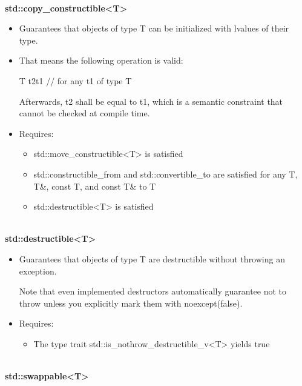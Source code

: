 \noindent
\hspace*{\fill} \\ %
\textbf{std::copy\_constructible<T>}

\begin{itemize}
\item
Guarantees that objects of type T can be initialized with lvalues of their type.

\item
That means the following operation is valid:

\begin{cpp}
T t2{t1} // for any t1 of type T
\end{cpp}

Afterwards, t2 shall be equal to t1, which is a semantic constraint that cannot be checked at compile time.

\item
Requires:
\begin{itemize}
\item
std::move\_constructible<T> is satisfied

\item
std::constructible\_from and std::convertible\_to are satisfied for any T, T\&, const T, and const T\& to T

\item
std::destructible<T> is satisfied
\end{itemize}
\end{itemize}


\noindent
\hspace*{\fill} \\ %
\textbf{std::destructible<T>}

\begin{itemize}
\item
Guarantees that objects of type T are destructible without throwing an exception.

Note that even implemented destructors automatically guarantee not to throw unless you explicitly mark them with noexcept(false).

\item
Requires:
\begin{itemize}
\item
The type trait std::is\_nothrow\_destructible\_v<T> yields true
\end{itemize}
\end{itemize}

\noindent
\hspace*{\fill} \\ %
\textbf{std::swappable<T>}

